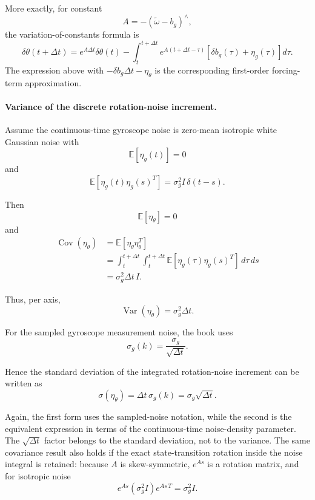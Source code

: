 \documentclass[11pt]{article}
\numberwithin{equation}{section}
\begin{document}
More exactly, for constant
\[
A=-(\tilde\omega-b_g)^\wedge,
\]
the variation-of-constants formula is
\[
\delta\theta(t+\Delta t)
=
e^{A\Delta t}\delta\theta(t)
-
\int_t^{t+\Delta t}
e^{A(t+\Delta t-\tau)}
\left[
\delta b_g(\tau)+\eta_g(\tau)
\right]d\tau.
\]
The expression above with
$-\delta b_g\Delta t-\eta_\theta$ is the corresponding first-order
forcing-term approximation.

\paragraph{Variance of the discrete rotation-noise increment.}

Assume the continuous-time gyroscope noise is zero-mean isotropic white
Gaussian noise with
\[
\mathbb{E}[\eta_g(t)]=0
\]
and
\begin{equation}
\boxed{
\mathbb{E}\!\left[
\eta_g(t)\eta_g(s)^T
\right]
=
\sigma_g^2 I\,\delta(t-s).
}
\end{equation}

Then
\[
\mathbb{E}[\eta_\theta]=0
\]
and
\begin{align}
\operatorname{Cov}(\eta_\theta)
&=
\mathbb{E}\!\left[
\eta_\theta\eta_\theta^T
\right]
\\
&=
\int_t^{t+\Delta t}
\int_t^{t+\Delta t}
\mathbb{E}\!\left[
\eta_g(\tau)\eta_g(s)^T
\right]
\,d\tau\,ds
\\
&=
\boxed{
\sigma_g^2\Delta t\,I.
}
\end{align}

Thus, per axis,
\begin{equation}
\boxed{
\operatorname{Var}(\eta_\theta)
=
\sigma_g^2\Delta t.
}
\end{equation}

For the sampled gyroscope measurement noise, the book uses
\begin{equation}
\boxed{
\sigma_g(k)
=
\frac{\sigma_g}{\sqrt{\Delta t}}.
}
\end{equation}

Hence the standard deviation of the integrated rotation-noise increment
can be written as
\begin{equation}
\boxed{
\sigma(\eta_\theta)
=
\Delta t\,\sigma_g(k)
=
\sigma_g\sqrt{\Delta t}.
}
\end{equation}

Again, the first form uses the sampled-noise notation, while the second is the
equivalent expression in terms of the continuous-time noise-density
parameter.  The $\sqrt{\Delta t}$ factor belongs to the standard
deviation, not to the variance.  The same covariance result also holds if the
exact state-transition rotation inside the noise integral is retained:
because $A$ is skew-symmetric, $e^{As}$ is a rotation matrix, and for
isotropic noise
\[
e^{As}(\sigma_g^2 I)e^{As\,T}
=
\sigma_g^2 I.
\]
\end{document}
